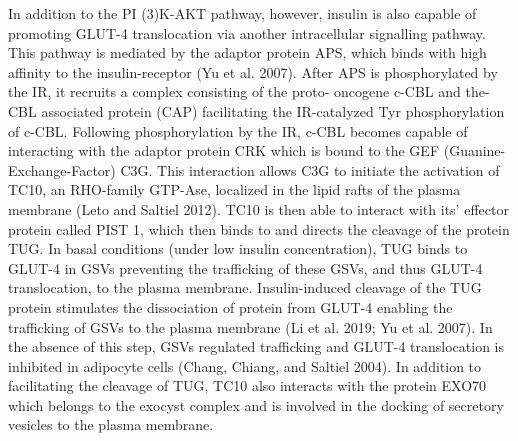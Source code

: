 \documentclass{article}
\begin{document}
In addition to the PI (3)K-AKT pathway, however, insulin is also capable of promoting GLUT-4 translocation via another
intracellular signalling pathway. This pathway is mediated by the adaptor protein APS, which binds with high affinity to
the insulin-receptor (Yu et al. 2007). After APS is phosphorylated by the IR, it recruits a complex consisting of the proto-
oncogene c-CBL and the-CBL associated protein (CAP) facilitating the IR-catalyzed Tyr phosphorylation of c-CBL. Following
phosphorylation by the IR, c-CBL becomes capable of interacting with the adaptor protein CRK which is bound to the GEF
(Guanine-Exchange-Factor) C3G. This interaction allows C3G to initiate the activation of TC10, an RHO-family GTP-Ase,
localized in the lipid rafts of the plasma membrane (Leto and Saltiel 2012). TC10 is then able to interact with its’ effector
protein called PIST 1, which then binds to and directs the cleavage of the protein TUG. In basal conditions (under low insulin
concentration), TUG binds to GLUT-4 in GSVs preventing the trafficking of these GSVs, and thus GLUT-4 translocation, to the
plasma membrane. Insulin-induced cleavage of the TUG protein stimulates the dissociation of protein from GLUT-4 enabling
the trafficking of GSVs to the plasma membrane (Li et al. 2019; Yu et al. 2007). In the absence of this step, GSVs regulated
trafficking and GLUT-4 translocation is inhibited in adipocyte cells (Chang, Chiang, and Saltiel 2004). In addition to facilitating
the cleavage of TUG, TC10 also interacts with the protein EXO70 which belongs to the exocyst complex and is involved in the
docking of secretory vesicles to the plasma membrane.
\end{document}
